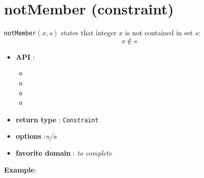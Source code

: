 \label{notmember}
\hypertarget{notmember}{}

\section{notMember (constraint)}\label{notmember:notmemberconstraint}\hypertarget{notmember:notmemberconstraint}{}
\begin{notedef}
\texttt{notMember}$(x,s)$ states that integer $x$ is not contained in set $s$:
$$x\not\in s$$  
\end{notedef}

\begin{itemize}
	\item \textbf{API} :
	\begin{itemize}
		\item {}
		\item {}
		\item {}
		\item {}
	\end{itemize}
	\item \textbf{return type} : \texttt{Constraint}
	\item \textbf{options} :\emph{n/a}
	\item \textbf{favorite domain} : \emph{to complete}
\end{itemize}

\textbf{Example}:

